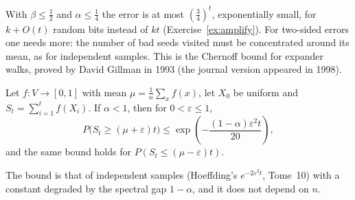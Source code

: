 With $\beta\le\frac12$ and $\alpha\le\frac14$ the error is at most $(\frac34)^t$, exponentially small, for $k+O(t)$ random bits instead of $kt$ (Exercise~\ref{ex:amplify}). For two-sided errors one needs more: the number of bad
seeds visited must be concentrated around its mean, as for independent samples. This is the Chernoff bound for expander walks, proved by David Gillman in 1993 (the journal version appeared in 1998).

\begin{theorem}\label{thm:expchernoff}
Let $f:V\to[0,1]$ with mean $\mu=\frac1n\sum_xf(x)$, let $X_0$ be uniform and $S_t=\sum_{i=1}^tf(X_i)$. If $\alpha<1$, then for $0<\varepsilon\le1$,
\[
P\bigl(S_t\ge(\mu+\varepsilon)t\bigr)\le\exp\left(-\frac{(1-\alpha)\varepsilon^2t}{20}\right),
\]
and the same bound holds for $P(S_t\le(\mu-\varepsilon)t)$.
\end{theorem}

The bound is that of independent samples (Hoeffding's $e^{-2\varepsilon^2t}$, Tome~10) with a constant degraded by the spectral gap $1-\alpha$, and it does not depend on $n$.

